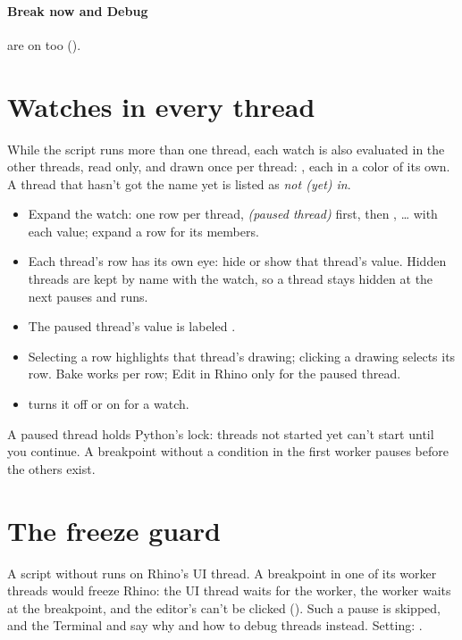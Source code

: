 \paragraph{Break now and Debug} are on  too ().

\section{Watches in every thread}\label{sec:everythread}

While the script runs more than one thread, each watch is also evaluated in the other threads, read only,
and drawn once per thread: , each in a color of its own. A thread that hasn't got the
name yet is listed as \emph{not (yet) in}.

\begin{itemize}
  \item Expand the watch: one row per thread, \emph{(paused thread)} first, then , … with each
        value; expand a row for its members.
  \item Each thread's row has its own eye: hide or show that thread's value. Hidden threads are kept by name
        with the watch, so a thread stays hidden at the next pauses and runs.
  \item The paused thread's value is labeled .
  \item Selecting a row highlights that thread's drawing; clicking a drawing selects its row. Bake works per
        row; Edit in Rhino only for the paused thread.
  \item {} turns it off or on for a watch.
\end{itemize}

\begin{note}
A paused thread holds Python's lock: threads not started yet can't start until you continue. A breakpoint
without a condition in the first worker pauses before the others exist.
\end{note}

\section{The freeze guard}\label{sec:freezeguard}

A script without  runs on Rhino's UI thread. A breakpoint in one of its worker threads
would freeze Rhino: the UI thread waits for the worker, the worker waits at the breakpoint, and the editor's
 can't be clicked (). Such a pause is skipped, and the Terminal and
 say why and how to debug threads instead. Setting: .

